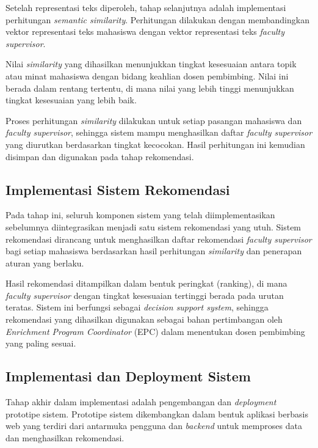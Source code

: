 Setelah representasi teks diperoleh, tahap selanjutnya adalah implementasi perhitungan \textit{semantic similarity}. Perhitungan dilakukan dengan membandingkan vektor representasi teks mahasiswa dengan vektor representasi teks \textit{faculty supervisor}.

Nilai \textit{similarity} yang dihasilkan menunjukkan tingkat kesesuaian antara topik atau minat mahasiswa dengan bidang keahlian dosen pembimbing. Nilai ini berada dalam rentang tertentu, di mana nilai yang lebih tinggi menunjukkan tingkat kesesuaian yang lebih baik.

Proses perhitungan \textit{similarity} dilakukan untuk setiap pasangan mahasiswa dan \textit{faculty supervisor}, sehingga sistem mampu menghasilkan daftar \textit{faculty supervisor} yang diurutkan berdasarkan tingkat kecocokan. Hasil perhitungan ini kemudian disimpan dan digunakan pada tahap rekomendasi.

\subsection{Implementasi Sistem Rekomendasi}\label{implementasi-sistem-rekomendasi}

Pada tahap ini, seluruh komponen sistem yang telah diimplementasikan sebelumnya diintegrasikan menjadi satu sistem rekomendasi yang utuh. Sistem rekomendasi dirancang untuk menghasilkan daftar rekomendasi \textit{faculty supervisor} bagi setiap mahasiswa berdasarkan hasil perhitungan \textit{similarity} dan penerapan aturan yang berlaku.

Hasil rekomendasi ditampilkan dalam bentuk peringkat (ranking), di mana \textit{faculty supervisor} dengan tingkat kesesuaian tertinggi berada pada urutan teratas. Sistem ini berfungsi sebagai \textit{decision support system}, sehingga rekomendasi yang dihasilkan digunakan sebagai bahan pertimbangan oleh \textit{Enrichment Program Coordinator} (EPC) dalam menentukan dosen pembimbing yang paling sesuai.

\subsection{Implementasi dan Deployment Sistem}\label{implementasi-dan-deployment-sistem}

Tahap akhir dalam implementasi adalah pengembangan dan \textit{deployment} prototipe sistem. Prototipe sistem dikembangkan dalam bentuk aplikasi berbasis web yang terdiri dari antarmuka pengguna dan \textit{backend} untuk memproses data dan menghasilkan rekomendasi.

